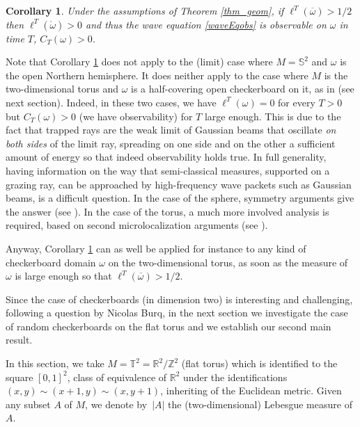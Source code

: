 \documentclass[JEP,XML,SOM,Unicode, NoEqCountersInSection,NoFloatCountersInSection,published]{cedram}
\def\R{\mathbb{R}}
\def\Z{\mathbb{Z}}
\newtheorem{corollary}{Corollary}
\theoremstyle{definition}
\begin{document}
\begin{corollary} \label{cor_geom}
Under the assumptions of Theorem \ref{thm_geom}, if $\ell^T(\overline\omega) >1/2$ then $\ell^T(\mathring{\omega})>0$ and thus the wave equation \eqref{waveEqobs} is observable on $\omega$ in time $T$, \ie $C_T(\omega)>0$.
\end{corollary}

Note that Corollary \ref{cor_geom} does not apply to the (limit) case where $M=\mathbb{S}^2$ and $\omega$ is the open Northern hemisphere. It does neither apply to the case where $M$ is the two-dimensional torus and $\omega$ is a half-covering open checkerboard on it, as in \cite{Burq2017,BurqGerard2018} (see next section). Indeed, in these two cases, we have $\ell^T(\omega)=0$ for every $T>0$ but $C_T(\omega)>0$ (\ie we have observability) for $T$ large enough. This is due to the fact that trapped rays are the weak limit of Gaussian beams that oscillate \emph{on both sides} of the limit ray, spreading on one side and on the other a sufficient amount of energy so that indeed observability holds true. In full generality, having information on the way that semi-classical measures, supported on a grazing ray, can be approached by high-frequency wave packets such as Gaussian beams, is a difficult question. In the case of the sphere, symmetry arguments give the answer (see \cite{Lebeau_JEDP1992}). In the case of the torus, a much more involved analysis is required, based on second microlocalization arguments (see \cite{Burq2017,BurqGerard2018}).

Anyway, Corollary \ref{cor_geom} can as well be applied for instance to any kind of checkerboard domain $\omega$ on the two-dimensional torus, as soon as the measure of $\omega$ is large enough so that $\ell^T(\overline\omega)>1/2$.

Since the case of checkerboards (in dimension two) is interesting and challenging, following a question by Nicolas Burq, in the next section we investigate the case of random checkerboards on the flat torus and we establish our second main result.

In this section, we take $M=\mathbb{T}^2= \R^2/ \Z^2$ (flat torus) which is identified to the square $[0,1]^2$, class of equivalence of $\R^2$ under the identifications $(x,y)\sim(x+1,y)\sim(x,y+1)$, inheriting of the Euclidean metric.
Given any subset $A$ of $M$, we denote by~$|A|$ the (two-dimensional) Lebesgue measure of $A$.
\end{document}
